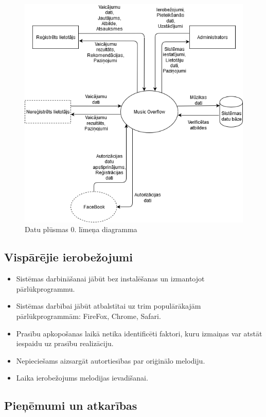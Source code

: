 \documentclass[12pt]{article}
\begin{document}
\begin{figure}[H]
\begin{center}
		\includegraphics[scale=0.5]{DPD0.png}
		\caption{Datu plūsmas 0. līmeņa diagramma}
		\label{fig:dpd_0}
\end{center}
\end{figure}

\subsection{Vispārējie ierobežojumi}

\begin{itemize}
\item Sistēmas darbināšanai jābūt bez instalēšanas un izmantojot pārlūkprogrammu.
\item Sistēmas darbībai jābūt atbalstītai uz trim populārākajām pārlūkprogrammām: FireFox, Chrome, Safari.
\item Prasību apkopošanas laikā netika identificēti faktori, kuru izmaiņas var atstāt iespaidu uz prasību realizāciju.
\item Nepieciešams aizsargāt autortiesības par oriģinālo melodiju.
\item Laika ierobežojums melodijas ievadīšanai.
\end{itemize}

\subsection{Pieņēmumi un atkarības}
\end{document}
